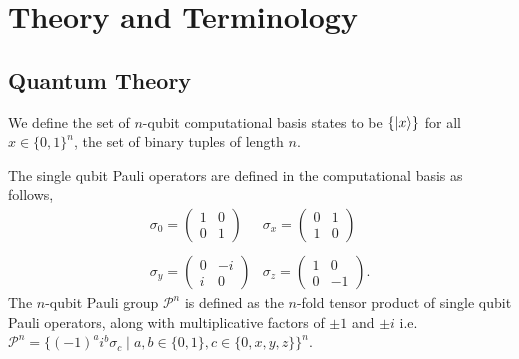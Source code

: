 \documentclass{article}
\theoremstyle{definition}
\theoremstyle{problem}
\theoremstyle{lemma}
\begin{document}
	\section{Theory and Terminology}
	\label{s2_Theory}
		\subsection{Quantum Theory}
		We define the set of $n$-qubit computational basis states to be $\{\left\vert{x}\right\rangle\}$ for all $x \in \{0,1\}^n$, the set of binary tuples of length $n$.
		
		The single qubit Pauli operators are defined in the computational basis as follows,
		\begin{equation}
		\label{e1_Paulis}
		\begin{matrix}
		\sigma_0 = \begin{pmatrix}1 & 0 \\ 0 & 1\end{pmatrix} & \sigma_x = \begin{pmatrix}0 & 1 \\ 1 & 0\end{pmatrix} \\
		& \\
		\sigma_y = \begin{pmatrix}0 & -i \\ i & 0\end{pmatrix} & \sigma_z = \begin{pmatrix}1 & 0 \\ 0 & -1\end{pmatrix}.
		\end{matrix}
		\end{equation}
		The $n$-qubit Pauli group $\mathcal{P}^n$ is defined as the $n$-fold tensor product of single qubit Pauli operators, along with multiplicative factors of $\pm1$ and $\pm i$ i.e. $\mathcal{P}^n = \{\left(-1\right)^a i^b \sigma_c \mid a,b \in \{0,1\}, c \in\{0,x,y,z\}\}^n$.
		
\end{document}
